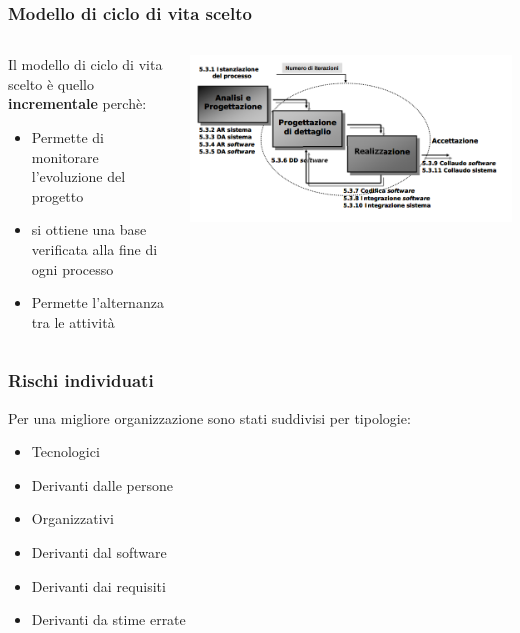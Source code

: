 \begin{frame}
  \frametitle{Modello di ciclo di vita scelto}

  \begin{columns}
    \begin{column}{0.6\textwidth}
      
      Il modello di ciclo di vita scelto è quello \textbf{incrementale} perchè:
      \begin{itemize}
      \item Permette di monitorare l'evoluzione del progetto
      \item si ottiene una base verificata alla fine di ogni processo
      \item Permette l'alternanza tra le attività
      \end{itemize}
    \end{column}
    \begin{column}{0.4\textwidth}
      \includegraphics[width=0.8\columnwidth]{res/img/Incrementale.png}
    \end{column}
  \end{columns}
\end{frame}


\begin{frame}
  \frametitle{Rischi individuati}
  Per una migliore organizzazione sono stati suddivisi per tipologie:
  \begin{itemize}
  \item Tecnologici
  \item Derivanti dalle persone
  \item Organizzativi
  \item Derivanti dal software
  \item Derivanti dai requisiti
  \item Derivanti da stime errate
  \end{itemize}
\end{frame}
  
